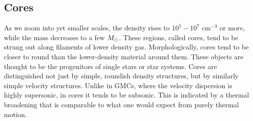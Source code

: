 \subsection{Cores}

As we zoom into yet smaller scales, the density rises to $10^5 - 10^7$ cm$^{-3}$ or more, while the mass decreases to a few $M_{\odot}$. These regions, called cores, tend to be strung out along filaments of lower density gas. Morphologically, cores tend to be closer to round than the lower-density material around them. These objects are thought to be the progenitors of single stars or star systems. Cores are distinguished not just by simple, roundish density structures, but by similarly simple velocity structures. Unlike in GMCs, where the velocity dispersion is highly supersonic, in cores it tends to be subsonic. This is indicated by a thermal broadening that is comparable to what one would expect from purely thermal motion.


